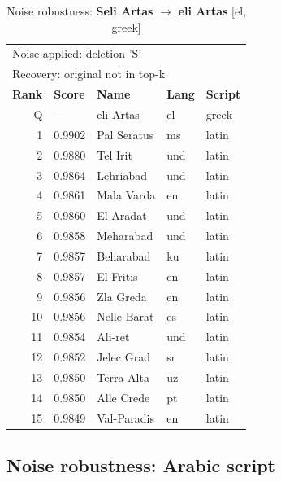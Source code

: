 \begin{table}[htbp]
\centering
\small
\caption{Noise robustness: \textbf{Seli Artas} $\rightarrow$ \textbf{eli Artas} [el, greek]}
\label{tab:noise-30}
\begin{tabular}{rllll}
\toprule
\multicolumn{5}{l}{\small Noise applied: deletion 'S'} \\
\multicolumn{5}{l}{\small Recovery: original not in top-k} \\
\midrule
\textbf{Rank} & \textbf{Score} & \textbf{Name} & \textbf{Lang} & \textbf{Script} \\
\midrule
\rowcolor{gray!20} Q & --- & eli Artas & el & greek \\
\midrule
1 & 0.9902 & Pal Seratus & ms & latin \\
2 & 0.9880 & Tel Irit & und & latin \\
3 & 0.9864 & Lehriabad & und & latin \\
4 & 0.9861 & Mala Varda & en & latin \\
5 & 0.9860 & El Aradat & und & latin \\
6 & 0.9858 & Meharabad & und & latin \\
7 & 0.9857 & Beharabad & ku & latin \\
8 & 0.9857 & El Fritis & en & latin \\
9 & 0.9856 & Zla Greda & en & latin \\
10 & 0.9856 & Nelle Barat & es & latin \\
11 & 0.9854 & Ali-ret & und & latin \\
12 & 0.9852 & Jelec Grad & sr & latin \\
13 & 0.9850 & Terra Alta & uz & latin \\
14 & 0.9850 & Alle Crede & pt & latin \\
15 & 0.9849 & Val-Paradis & en & latin \\
\bottomrule
\end{tabular}
\end{table}

\subsection*{Noise robustness: Arabic script}

